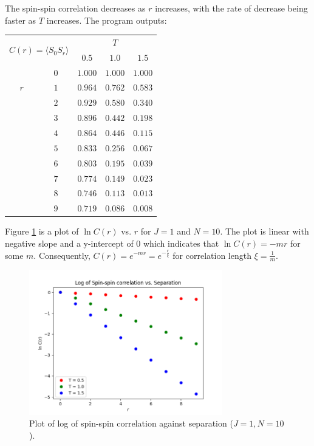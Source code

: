 \documentclass{article}
\begin{document}
\clearpage

\problem
The spin-spin correlation decreases as $r$ increases, with the rate of decrease being faster as $T$ increases. The program outputs:
    \begin{center}
    \begin{tabular}{|c|c|c|c|c|} \hline 
\multicolumn{2}{|c|}{\multirow{2}{*}{$C(r) = \langle S_0 S_r \rangle$}} &                                                   
  \multicolumn{3}{|c|}{$T$ }  \\ \cline{3-5} 
\multicolumn{2}{|c|}{}   & $0.5$ & $1.0$ & $1.5$ \\ \cline{1-5} 
\multirow{3}{*}{$r$} 
& $0$ & $1.000$ & $1.000$ & $1.000$ \\ \cline{2-5} 
& $1$ & $0.964$ & $0.762$ & $0.583$ \\ \cline{2-5} 
& $2$ & $0.929$ & $0.580$ & $0.340$ \\ \cline{2-5} 
& $3$ & $0.896$ & $0.442$ & $0.198$ \\ \cline{2-5} 
& $4$ & $0.864$ & $0.446$ & $0.115$ \\ \cline{2-5} 
& $5$ & $0.833$ & $0.256$ & $0.067$ \\ \cline{2-5} 
& $6$ & $0.803$ & $0.195$ & $0.039$ \\ \cline{2-5} 
& $7$ & $0.774$ & $0.149$ & $0.023$ \\ \cline{2-5} 
& $8$ & $0.746$ & $0.113$ & $0.013$ \\ \cline{2-5} 
& $9$ & $0.719$ & $0.086$ & $0.008$ \\ \hline 
\end{tabular}
    \end{center}

\clearpage

\problem
Figure \ref{fig:fig1} is a plot of $\ln C\left(r\right)$ vs. $r$ for $J = 1$ and $N = 10$. The plot is linear with negative slope and a y-intercept of $0$ which indicates that $\ln C\left(r\right) = -mr$ for some $m$. Consequently, $C\left(r\right) = e^{-mr} = e^{-\frac{r}{\xi}}$ for correlation length $\xi = \frac{1}{m}$.

\begin{figure}[!htb]
    \centering
    \includegraphics[width=0.75\textwidth]{../code/phy112l_lab4/4-5.png}
    \caption{Plot of log of spin-spin correlation against separation ($J = 1, N = 10$).}
    \label{fig:fig1}
\end{figure}
\end{document}
